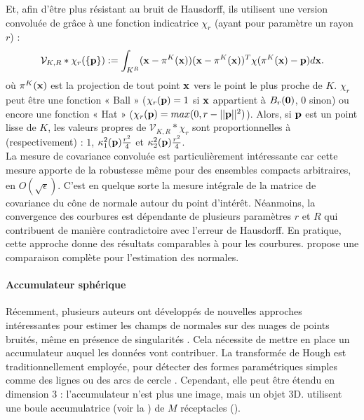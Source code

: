 Et, afin d'être plus résistant au bruit de Hausdorff, ils utilisent une
version convoluée de \VCM grâce à une fonction indicatrice $\chi_r$
(ayant pour paramètre un rayon $r$) :
%
\begin{equation}
  \mathcal{V}_{K,R} \ast \chi_r(\{\mathbf{p}\}) := \int_{K^R} (\mathbf{x} - \pi^K(\mathbf{x}))(\mathbf{x} - \pi^K(\mathbf{x}))^T \chi(\pi^K(\mathbf{x}) - \mathbf{p}) d\mathbf{x} .
\end{equation}
%
où $\pi^K(\mathbf{x})$ est la projection de tout point $\mathbf{x}$ vers le point le plus
proche de $K$. $\chi_r$ peut être une fonction « Ball » ($\chi_r(\mathbf{p}) = 1$ si
$\mathbf{x}$ appartient à $B_{r}(\mathbf{0})$, $0$ sinon) ou encore une fonction «
Hat » ($\chi_r(\mathbf{p}) = max(0, r - ||\mathbf{p}||^2)$).
%
Alors, si $\mathbf{p}$ est un point lisse de $K$, les valeurs propres de
$\mathcal{V}_{K,R} \ast \chi_r$ sont proportionnelles à (respectivement) : $1$,
$\kappa_{1}^2(\mathbf{p})\frac{r^2}{4}$ et $\kappa_{2}^2(\mathbf{p})\frac{r^2}{4}$.
%
\\
%
La mesure de covariance convoluée est particulièrement intéressante car cette
mesure apporte de la robustesse même pour des ensembles compacts arbitraires, en
$O(\sqrt{\epsilon})$. C'est en quelque sorte la mesure intégrale de la matrice
de covariance du cône de normale autour du point d'intérêt. Néanmoins, la
convergence des courbures est dépendante de plusieurs paramètres $r$ et $R$ qui
contribuent de manière contradictoire avec l'erreur de Hausdorff. En pratique,
cette approche donne des résultats comparables à \JetFitting pour les courbures.
 propose une comparaison complète pour l'estimation des
normales.
%
\paragraph{Accumulateur sphérique}
%
Récemment, plusieurs auteurs ont développés de nouvelles approches intéressantes
pour estimer les champs de normales sur des nuages de points bruités, même en
présence de singularités \cite{Li2010, Boulch2012, Zhang2013}. Cela nécessite de
mettre en place un accumulateur auquel les données vont contribuer. La
transformée de Hough \cite{Hough1962} est traditionnellement employée, pour
détecter des formes paramétriques simples comme des lignes ou des arcs de cercle
\cite{Duda1972}. Cependant, elle peut être étendu en dimension 3 :
l'accumulateur n'est plus une image, mais un objet 3D.
 utilisent une boule accumulatrice (voir la
) de $M$ réceptacles ().

